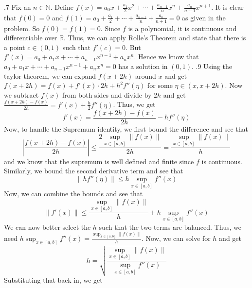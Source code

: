 \documentclass[12pt]{exam}
\begin{document}
\begin{questions}
.7\newline
Fix an $n \in \mathbb{N}$. Define $f(x) = a_0x+\frac{a_1}2x^2+\cdots+\frac{a_{n-1}}nx^{n}+\frac{a_n}{n+1}x^{n+1}$. It is clear that $f(0) = 0$ and $f(1) =  a_0+\frac{a_1}2+\cdots+\frac{a_{n-1}}n+\frac{a_n}{n+1} = 0$ as given in the problem. So $f(0) = f(1) = 0$. Since $f$ is a polynomial, it is continuous and differentiable over $\mathbb{R}$. Thus, we can apply Rolle's Theorem and state that there is a point $c \in (0,1)$ such that $f'(c) = 0$. But $f'(x) = a_0+a_1x+\cdots+a_{n-1}x^{n-1}+a_nx^{n}$. Hence we know that $a_0+a_1x+\cdots+a_{n-1}x^{n-1}+a_nx^{n}=0$ has a solution in $(0,1)$. 
.9\newline
Using the taylor theorem, we can expand $f(x+2h)$ around $x$ and get $f(x+2h)=f(x)+f'(x)\cdot 2h+h^2f''(\eta)$ for some $\eta \in (x,x+2h)$. Now we subtract $f(x)$ from both sides and divide by $2h$ and get $\frac{f(x+2h)-f(x)}{2h}=f'(x)+\frac{h}{2}f''(\eta)$. Thus, we get \[f'(x)=\frac{f(x+2h)-f(x)}{2h}-hf''(\eta)\] Now, to handle the Supremum identity, we first bound the difference and see that \[\left|\frac{f(x+2h)-f(x)}{2h} \right|\leq \frac{2\sup_{x\in[a,b]}\|f(x)\|}{2h} = \frac{\sup_{x\in[a,b]}\|f(x)\|}{h}\] and we know that the supremum is well defined and finite since $f$ is continuous. Similarly, we bound the second derivative term and see that \[\|hf''(\eta)\| \leq h\sup_{x\in[a,b]}f''(x)\] Now, we can combine the bounds and see that \[\|f'(x)\|\leq \frac{\sup_{x\in[a,b]}\|f(x)\|}{h}+h\sup_{x\in[a,b]}f''(x)\] We can now better select the $h$ such that the two terms are balanced. Thus, we need $h\sup_{x\in[a,b]}f''(x)=\frac{\sup_{x\in[a,b]}\|f(x)\|}{h}$. Now, we can solve for $h$ and get \[h = \sqrt{\frac{\sup_{x\in[a,b]}\|f(x)\|}{\sup_{x\in[a,b]}f''(x)}}\] Substituting that back in, we get 

\end{questions}
\end{document}
